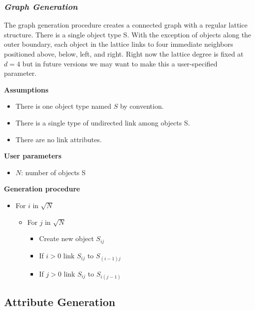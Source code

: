 \documentclass[11pt]{article}
\begin{document}
\vspace{-3.mm}
\subsubsection*{\emph{Graph Generation}}
\vspace{-5.mm}
The graph generation procedure creates a connected graph with a regular lattice structure. There is a single object type S. With the exception of objects along the outer boundary, each object in the lattice links to four immediate neighbors positioned above, below, left, and right. Right now the lattice degree is fixed at $d=4$ but in future versions we may want to make this a user-specified parameter.

\small{
\textbf{Assumptions}
\vspace{-5.mm}
\begin{itemize}
\item There is one object type named $S$ by convention.
\item There is a single type of undirected link among objects S.
\item There are no link attributes.
\end{itemize}
}

\small{
\textbf{User parameters}
\vspace{-5.mm}
\begin{itemize}
\item $N$: number of objects S
\end{itemize}
}

\small{
\textbf{Generation procedure}
\vspace{-5.mm}
\begin{itemize}
\item For $i$ in $\sqrt N$
	\begin{itemize}
	\item For $j$ in $\sqrt N$
		\begin{itemize}
		\item Create new object $S_{ij}$
		\item If $i>0$ link $S_{ij}$ to $S_{(i-1)j}$
		\item If $j>0$ link $S_{ij}$ to $S_{i(j-1)}$
		\end{itemize}
	\end{itemize}
\end{itemize}
}


\vspace{-2.mm}
\subsection*{Attribute Generation}
\vspace{-4.mm}
\end{document}

